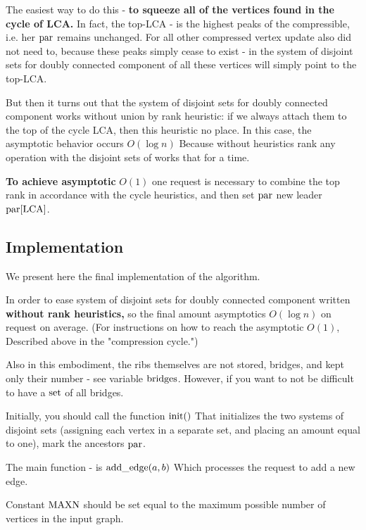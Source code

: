\begin{itemize}
The easiest way to do this - \textbf{to squeeze all of the vertices found in the cycle of LCA.} In fact, the top-LCA - is the highest peaks of the compressible, i.e. her ${\rm par}$ remains unchanged. For all other compressed vertex update also did not need to, because these peaks simply cease to exist - in the system of disjoint sets for doubly connected component of all these vertices will simply point to the top-LCA.

But then it turns out that the system of disjoint sets for doubly connected component works without union by rank heuristic: if we always attach them to the top of the cycle LCA, then this heuristic no place. In this case, the asymptotic behavior occurs $O (\log n)$ Because without heuristics rank any operation with the disjoint sets of works that for a time.

\textbf{To achieve asymptotic} \textbf{$O (1)$} one request is necessary to combine the top rank in accordance with the cycle heuristics, and then set ${\rm par}$ new leader ${\rm par} [{\rm LCA}]$.

\end{itemize}

\subsection{ Implementation }

We present here the final implementation of the algorithm.

In order to ease system of disjoint sets for doubly connected component written \textbf{without rank heuristics,} so the final amount asymptotics $O (\log n)$ on request on average. (For instructions on how to reach the asymptotic $O (1)$, Described above in the "compression cycle.")

Also in this embodiment, the ribs themselves are not stored, bridges, and kept only their number - see variable $\rm bridges$. However, if you want to not be difficult to have a ${\rm set}$ of all bridges.

Initially, you should call the function ${\rm init}()$ That initializes the two systems of disjoint sets (assigning each vertex in a separate set, and placing an amount equal to one), mark the ancestors ${\rm par}$.

The main function - is ${\rm add \_edge} (a, b)$ Which processes the request to add a new edge.

Constant $\rm MAXN$ should be set equal to the maximum possible number of vertices in the input graph.

